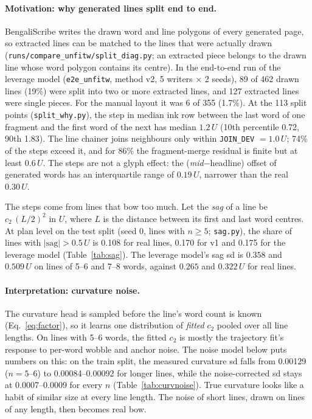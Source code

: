 \documentclass[11pt,a4paper]{article}
\newcommand{\U}{\ensuremath{U}}
\newcommand{\src}[1]{{\footnotesize\texttt{#1}}}
\begin{document}
\paragraph{Motivation: why generated lines split end to end.} BengaliScribe
writes the drawn word and line polygons of every generated page, so extracted
lines can be matched to the lines that were actually drawn
(\src{runs/compare\_unfitw/split\_diag.py}; an extracted piece belongs to the
drawn line whose word polygon contains its centre). In the end-to-end run of
the leverage model (\texttt{e2e\_unfitw}, method v2, 5 writers $\times$ 2
seeds), 89 of 462 drawn lines (19\%) were split into two or more extracted
lines, and 127 extracted lines were single pieces. For the manual layout it was
6 of 355 (1.7\%). At the 113 split points
(\src{split\_why.py}), the step in median ink row between the last word of one
fragment and the first word of the next has median $1.2\,\U$ (10th percentile
0.72, 90th 1.83). The line chainer joins neighbours only within
\texttt{JOIN\_DEV} $=1.0\,\U$; 74\% of the steps exceed it, and for 86\% the
fragment-merge residual is finite but at least $0.6\,\U$. The steps are not a
glyph effect: the (\textit{mid}$-$headline) offset of generated words has an
interquartile range of $0.19\,\U$, narrower than the real $0.30\,\U$.

The steps come from lines that bow too much. Let the \emph{sag} of a line be
$c_2\,(L/2)^2$ in \U, where $L$ is the distance between its first and last
word centres. At plan level on the test split (seed 0, lines with $n\ge5$;
\src{sag.py}), the share of lines with $|\text{sag}|>0.5\,\U$ is 0.108 for
real lines, 0.170 for v1 and 0.175 for the leverage model
(Table~\ref{tab:sag}). The leverage model's sag sd is $0.358$ and
$0.509\,\U$ on lines of 5--6 and 7--8 words, against $0.265$ and $0.322\,\U$
for real lines.

\paragraph{Interpretation: curvature noise.} The curvature head is sampled
before the line's word count is known (Eq.~\ref{eq:factor}), so it learns one
distribution of \emph{fitted} $c_2$ pooled over all line lengths. On lines
with 5--6 words, the fitted $c_2$ is mostly the trajectory fit's response to
per-word wobble and anchor noise. The noise model below puts numbers on this:
on the train split, the measured curvature sd falls from 0.00129 ($n=5$--6) to
0.00084--0.00092 for longer lines, while the noise-corrected sd stays at
0.0007--0.0009 for every $n$ (Table~\ref{tab:curvnoise}). True curvature looks
like a habit of similar size at every line length. The noise of short lines,
drawn on lines of any length, then becomes real bow.
\end{document}

